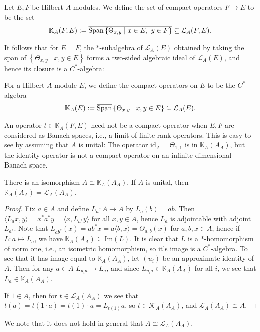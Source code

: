 \begin{definition}
	Let $E,F$ be Hilbert $A$-modules. We define the set of compact operators $F \to E$ to be the set
	\begin{align*}
		\mathbb{K}_A(F,E) := \overline{\mathrm{Span}\left\{ \Theta_{x,y} \mid x \in E, \ y \in F \right\}}\subseteq \mathcal{L}_A(F,E).
	\end{align*}
\end{definition}
It follows that for $E=F$, the $*$-subalgebra of $\mathcal{L}_A(E)$ obtained by taking the span of $\left\{ \Theta_{x,y} \mid x,y \in E \right\}$ forms a two-sided algebraic ideal of $\mathcal{L}_A(E)$, and hence its closure is a $C^*$-algebra:
\begin{definition}
	For a Hilbert $A$-module $E$, we define the compact operators on $E$ to be the $C^*$-algebra
	\begin{align*}
		\mathbb{K}_A(E):= \overline{\mathrm{Span}}\left\{ \Theta_{x,y} \mid x,y \in E \right\} \subseteq \mathcal{L}_A(E).
	\end{align*}
\end{definition}
\begin{note}
	An operator $t \in \mathbb{K}_A(F,E)$ need not be a compact operator when $E,F$ are considered as Banach spaces, i.e., a limit of finite-rank operators. This is easy to see by assuming that $A$ is unital: The operator $\mathrm{id}_A =\Theta_{1,1}$ is in $\mathbb{K}_A(A_A)$, but the identity operator is not a compact operator on an infinite-dimensional Banach space.
\end{note}
\begin{lemma}
	There is an isomorphism $A \cong \mathbb{K}_A(A_A)$. If $A$ is unital, then $\mathbb{K}_A(A_A) = \mathcal{L}_A(A_A)$.
\end{lemma}
\begin{proof}
	Fix $a \in A$ and define $L_a \colon A \to A$ by $L_a(b)=ab$. Then $\langle L_a x,y \rangle = x^* a^*y = \langle x, L_{a^*}y\rangle$ for all $x,y \in A$, hence $L_a$ is adjointable with adjoint $L_{a^*}$. Note that $L_{ab^*}(x) = ab^*x = a\langle b,x \rangle = \Theta_{a,b}(x)$ for $a,b,x \in A$, hence if $L\colon a \mapsto L_a$, we have $\mathbb{K}_A(A_A) \subseteq \mathrm{Im}(L)$. It is clear that $L$ is a $*$-homomorphism of norm one, i.e., an isometric homomorphism, so it's image is a $C^*$-algebra. To see that it has image equal to $\mathbb{K}_A(A_A)$, let $(u_i)$ be an approximate identity of $A$. Then for any $a \in A$ $L_{u_i a} \to L_{a}$, and since $L_{u_ia} \in \mathbb{K}_{A}(A_A)$ for all $i$, we see that $L_a \in \mathbb{K}_A(A_A)$.

	If $1 \in A$, then for $t \in \mathcal{L}_A(A_A)$ we see that $t(a)=t(1\cdot a)=t(1)\cdot a=L_{t(1)}a$, so $t \in \mathcal{K}_A(A_A)$, and $\mathcal{L}_A(A_A) \cong A$.
\end{proof}
We note that it does not hold in general that $A \cong \mathcal{L}_A(A_A)$.

